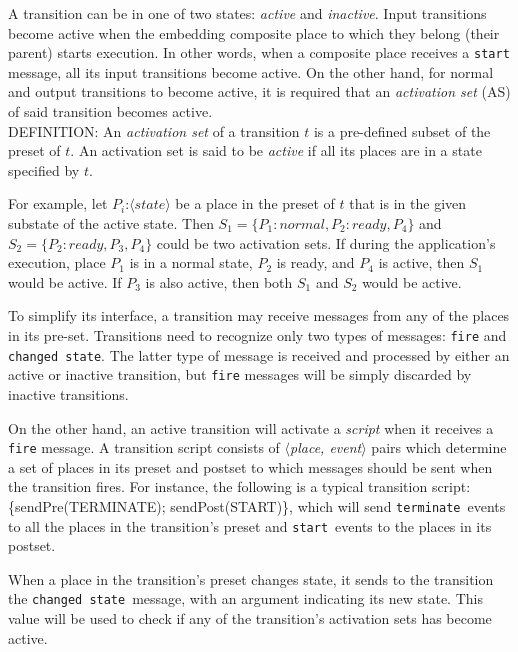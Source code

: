 \documentclass[twocolumn,10pt]{article}
\newcommand{\term}{{\tt terminate}}
\newcommand{\start}{{\tt start}}
\newcommand{\changedState}{{\tt changed state}}
\newcommand{\termRep}{TERMINATE}
\newcommand{\startRep}{START}
\newcommand{\event}[1]{{\tt #1}}
\newenvironment{definition}{DEFINITION:}{}
\begin{document}
A transition can be in one of two states: {\em active} and {\em
inactive}.  Input transitions become active when the embedding
composite place to which they belong (their parent) starts execution.
In other words, when a composite place receives a \event{start}
message, all its input transitions become active.  On the other hand,
for normal and output transitions to become active, it is required
that an {\em activation set} (AS) of said transition becomes active.\\

\begin{definition}
  An {\em activation set} of a transition $t$ is a pre-defined subset
  of the preset of $t$.  An activation set is said to be {\em active}
  if all its places are in a state specified by $t$.
\end{definition}

For example, let $P_i$:$\langle state\rangle$ be a place in the preset of $t$
that is in the given substate of the active state.  Then $S_1 =
\{P_1:normal, P_2:ready, P_4\}$ and $S_2 = \{P_2:ready, P_3, P_4\}$
could be two activation sets.  If during the application's execution,
place $P_1$ is in a normal state, $P_2$ is ready, and $P_4$ is active,
then $S_1$ would be active.  If $P_3$ is also active, then both $S_1$
and $S_2$ would be active.

To simplify its interface, a transition may receive messages from any of
the places in its pre-set.  Transitions need to recognize only two types of
messages: \event{fire} and \event{changed state}.  The latter type of
message is received and processed by either an active or inactive
transition, but \event{fire} messages will be simply discarded by inactive
transitions.

On the other hand, an active transition will activate a {\em script} when it
receives a \event{fire} message.  A transition  script consists
of $\langle${\em place, event}$\rangle$ pairs which determine a set of
places in its preset and postset to which messages should be sent when
the transition fires.  For instance, the following is a typical transition
script: \{sendPre(\termRep); sendPost(\startRep)\}, which will
send \term\ events to all the places in the transition's preset and
\start\ events to the places in its postset.

When a place in the transition's preset changes state, it sends to the
transition the \changedState\ message, with an argument indicating its
new state.  This value will be used to check if any of the
transition's activation sets has become active.
\end{document}
